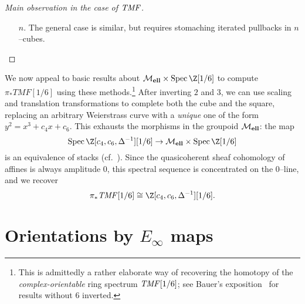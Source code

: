 \begin{proof}[{Main observation in the case of \(\mathit{TMF}\)}]
\begin{enumerate}
\begin{figure}
\begin{center}
    \end{center}
    \caption{Two expressions of the same cubical pullback.}\label{HypercubesFigure}
\end{figure}
    \item[\(n\).] The general case is similar, but requires stomaching iterated pullbacks in \(n\)--cubes. \qedhere
\end{enumerate}
\end{proof}

\begin{example}
We now appeal to basic results about \(\moduli{ell} \times \Spec \Z[1/6]\) to compute \(\pi_* TMF[1/6]\) using these methods.\footnote{This is admittedly a rather elaborate way of recovering the homotopy of the \emph{complex-orientable} ring spectrum \(\mathit{TMF}[1/6]\); see Bauer's exposition~\cite{BauerTMF} for results without $6$ inverted.}  After inverting \(2\) and \(3\), we can use scaling and translation transformations to complete both the cube and the square, replacing an arbitrary Weierstrass curve with a \emph{unique} one of the form \(y^2 = x^3 + c_4 x + c_6\).  This exhausts the morphisms in the groupoid \(\mathcal{M}_{\mathbf{ell}}\): the map \[\Spec \Z[c_4, c_6, \Delta^{-1}][1/6] \to \moduli{ell} \times \Spec \Z[1/6]\] is an equivalence of stacks (cf.\ ).  Since the quasicoherent sheaf cohomology of affines is always amplitude \(0\), this spectral sequence is concentrated on the \(0\)--line, and we recover \[\pi_* \TMF[1/6] \cong \Z[c_4, c_6, \Delta^{-1}][1/6].\]
\end{example}




















\section{Orientations by \texorpdfstring{\(E_\infty\)}{Eoo} maps}\label{JuvitopTalkSection}

